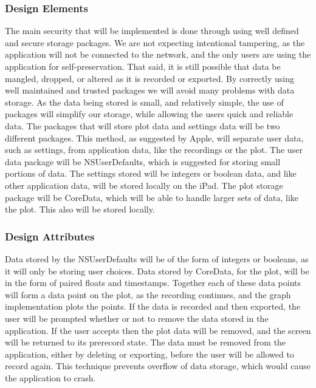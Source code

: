 \documentclass[onecolumn, draftclsnofoot,10pt, compsoc]{IEEEtran}
\begin{document}
\subsubsection{Design Elements}
The main security that will be implemented is done through using well defined and secure storage packages.
We are not expecting intentional tampering, as the application will not be connected to the network, and the only users are using the application for self-preservation.
That said, it is still possible that data be mangled, dropped, or altered as it is recorded or exported.
By correctly using well maintained and trusted packages we will avoid many problems with data storage.
As the data being stored is small, and relatively simple, the use of packages will simplify our storage, while allowing the users quick and reliable data.
The packages that will store plot data and settings data will be two different packages.
This method, as suggested by Apple\cite{coreApple}, will separate user data, such as settings, from application data, like the recordings or the plot.
The user data package will be NSUserDefaults, which is suggested for storing small portions of data.
The settings stored will be integers or boolean data, and like other application data, will be stored locally on the iPad.
The plot storage package will be CoreData, which will be able to handle larger sets of data, like the plot.
This also will be stored locally.

\subsubsection{Design Attributes}
Data stored by the NSUserDefaults will be of the form of integers or booleans, as it will only be storing user choices.
Data stored by CoreData, for the plot, will be in the form of paired floats and timestamps.
Together each of these data points will form a data point on the plot, as the recording continues, and the graph implementation plots the points.
If the data is recorded and then exported, the user will be prompted whether or not to remove the data stored in the application.
If the user accepts then the plot data will be removed, and the screen will be returned to its prerecord state.
The data must be removed from the application, either by deleting or exporting, before the user will be allowed to record again.
This technique prevents overflow of data storage, which would cause the application to crash.
\end{document}
